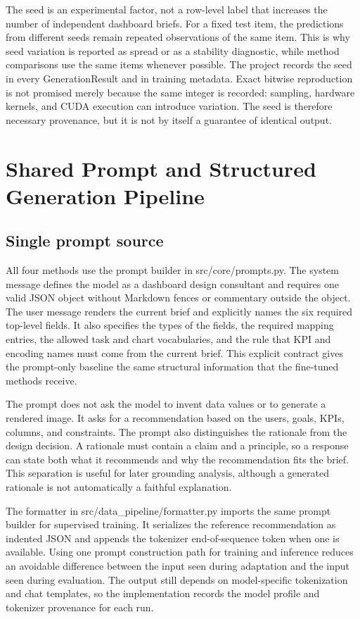 The seed is an experimental factor, not a row-level label that increases the number of independent dashboard briefs. For a fixed test item, the predictions from different seeds remain repeated observations of the same item. This is why seed variation is reported as spread or as a stability diagnostic, while method comparisons use the same items whenever possible. The project records the seed in every GenerationResult and in training metadata. Exact bitwise reproduction is not promised merely because the same integer is recorded: sampling, hardware kernels, and CUDA execution can introduce variation. The seed is therefore necessary provenance, but it is not by itself a guarantee of identical output.

\section{Shared Prompt and Structured Generation Pipeline}

\subsection{Single prompt source}

All four methods use the prompt builder in src/core/prompts.py. The system message defines the model as a dashboard design consultant and requires one valid JSON object without Markdown fences or commentary outside the object. The user message renders the current brief and explicitly names the six required top-level fields. It also specifies the types of the fields, the required mapping entries, the allowed task and chart vocabularies, and the rule that KPI and encoding names must come from the current brief. This explicit contract gives the prompt-only baseline the same structural information that the fine-tuned methods receive.

The prompt does not ask the model to invent data values or to generate a rendered image. It asks for a recommendation based on the users, goals, KPIs, columns, and constraints. The prompt also distinguishes the rationale from the design decision. A rationale must contain a claim and a principle, so a response can state both what it recommends and why the recommendation fits the brief. This separation is useful for later grounding analysis, although a generated rationale is not automatically a faithful explanation.

The formatter in src/data\_pipeline/formatter.py imports the same prompt builder for supervised training. It serializes the reference recommendation as indented JSON and appends the tokenizer end-of-sequence token when one is available. Using one prompt construction path for training and inference reduces an avoidable difference between the input seen during adaptation and the input seen during evaluation. The output still depends on model-specific tokenization and chat templates, so the implementation records the model profile and tokenizer provenance for each run.

